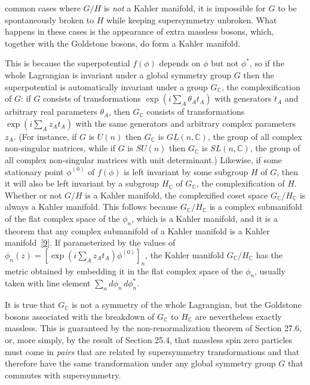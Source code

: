 common cases where \(G/H\) is \textit{not} a Kahler manifold, it is impossible
for \(G\) to be spontaneously broken to \(H\) while keeping supersymmetry
unbroken. What happens in these cases is the appearance of extra massless
bosons, which, together with the Goldstone bosons, do form a Kahler manifold.

This is because the superpotential \(f(\phi)\) depends on \(\phi\) but not
\(\phi^*\), so if the whole Lagrangian is invariant under a global symmetry
group \(G\) then the superpotential is automatically invariant under a group
\(G_{\mathbb{C}}\), the complexification of \(G\): if \(G\) consists of
transformations \(\exp(i\sum_A\theta_A t_A)\) with generators \(t_A\) and
arbitrary real parameters \(\theta_A\), then \(G_{\mathbb{C}}\) consists of
transformations \(\exp(i\sum_A z_A t_A)\) with the same generators and
arbitrary complex parameters \(z_A\). (For instance, if \(G\) is \(U(n)\)
then \(G_{\mathbb{C}}\) is \(GL(n,\mathbb{C})\), the group of all complex
non-singular matrices, while if \(G\) is \(SU(n)\) then \(G_{\mathbb{C}}\) is
\(SL(n,\mathbb{C})\), the group of all complex non-singular matrices with
unit determinant.) Likewise, if some stationary point \(\phi^{(0)}\) of
\(f(\phi)\) is left invariant by some subgroup \(H\) of \(G\), then it will
also be left invariant by a subgroup \(H_{\mathbb{C}}\) of
\(G_{\mathbb{C}}\), the complexification of \(H\). Whether or not \(G/H\) is
a Kahler manifold, the complexified coset space
\(G_{\mathbb{C}}/H_{\mathbb{C}}\) is always a Kahler manifold. This follows
because \(G_{\mathbb{C}}/H_{\mathbb{C}}\) is a complex submanifold of the flat
complex space of the \(\phi_n\), which is a Kahler manifold, and it is a
theorem that any complex submanifold of a Kahler manifold is a Kahler
manifold~\hyperref[ch26-ref-9]{[9]}. If parameterized by the values of
\(\phi_n(z)=[\exp(i\sum_A z_A t_A)\phi^{(0)}]_n\), the Kahler manifold
\(G_{\mathbb{C}}/H_{\mathbb{C}}\) has the metric obtained by embedding it in
the flat complex space of the \(\phi_n\), usually taken with line element
\(\sum_n d\phi_n\,d\phi_n^*\).

It is true that \(G_{\mathbb{C}}\) is not a symmetry of the whole Lagrangian,
but the Goldstone bosons associated with the breakdown of \(G_{\mathbb{C}}\)
to \(H_{\mathbb{C}}\) are nevertheless exactly massless. This is guaranteed
by the non-renormalization theorem of Section 27.6, or, more simply, by the
result of Section 25.4, that massless spin zero particles must come in
\textit{pairs} that are related by supersymmetry transformations and that
therefore have the same transformation under any global symmetry group \(G\)
that commutes with supersymmetry.
